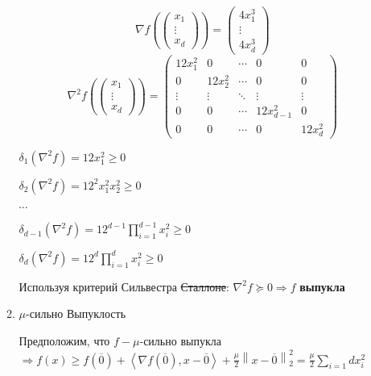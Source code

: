 \documentclass[a5paper,twoside,russian]{article}
\begin{document}
\begin{enumerate}[label=\textbf{Задача \arabic*.}]
\begin{prf}
\begin{enumerate}
            \[
            \nabla f 
            \left(
            \begin{pmatrix}
                x_1 \\
                \vdots \\
                x_d
            \end{pmatrix}
            \right) = 
            \begin{pmatrix}
                4 x_1^3 \\
                \vdots \\
                4 x_d^3
            \end{pmatrix}
            \]
            \[
            \nabla^2 f 
            \left( 
            \begin{pmatrix}
                x_1 \\
                \vdots \\
                x_d
            \end{pmatrix}
            \right) = 
            \begin{pmatrix}
            12 x_1^2 & 0 & \cdots & 0 & 0 \\
            0 & 12 x_2^2 & \cdots & 0 & 0 \\
            \vdots & \vdots & \ddots & \vdots & \vdots \\
            0 & 0 & \cdots & 12 x_{d-1}^2 & 0 \\
            0 & 0 & \cdots & 0 & 12 x_d^2
            \end{pmatrix}
            \]


            $\delta_1 (\nabla^2 f) = 12 x_1^2 \geq 0$

            $\delta_2 (\nabla^2 f) = 12^2 x_1^2 x_2^2 \geq 0$

            $\cdots$

            $\delta_{d-1} (\nabla^2 f) = 12^{d-1} \prod\limits_{i=1}^{d-1}x_i^2 \geq 0$

            $\delta_d (\nabla^2 f) = 12^{d} \prod\limits_{i=1}^{d}x_i^2 \geq 0$


            Используя критерий Сильвестра \sout{Сталлоне}: $\nabla^2 f \succeq 0 \Rightarrow f $ \textbf{выпукла}

            \item $\mu$-сильно Выпуклость
            
            Предположим, что $f - \mu$-сильно выпукла $\Rightarrow f(x) \geq f(\overline{0}) + \left\langle \nabla f(\overline{0}), x-\overline{0} \right\rangle + \frac{\mu}{2} \left\| x - \overline{0} \right\|_2^2 = \frac{\mu}{2} \sum\limits_{i=1}{d} x_i^2$


\end{enumerate}
\end{prf}
\end{enumerate}
\end{document}
